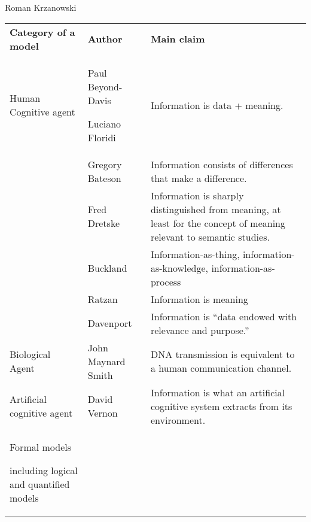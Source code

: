 \begin{artengenv}{Roman Krzanowski}
\begin{small}
\begin{longtable}{p{}p{}p{}}
{\bfseries Category of a model} &
{\bfseries Author} &
{\bfseries Main claim}\\
Human Cognitive agent &
Paul Beyond-Davis
\parencite*[][]{beynon-davies_business_2009}%


Luciano Floridi
\parencite*[][]{floridi_philosophy_2010}%
 &
Information is data + meaning.\\
&
Gregory Bateson
\parencite*[][]{bateson_mind_1979}%
 &
Information consists of differences that make a difference.\\
&
Fred Dretske
\parencite*[][]{dretske_knowledge_1999}%
 &
Information is sharply distinguished from meaning, at least for the concept of meaning relevant to semantic studies.\\
&
Buckland
\parencite*[][]{buckland_information_1991}%
 &
Information-as-thing, information-as-knowledge, information-as-process\\
&
Ratzan
\parencite*[][]{ratzan_understanding_2004}%
 &
Information is meaning\\
&
Davenport
\parencite*[][]{davenport_information_1997}%
 &
Information is ``data endowed with relevance and purpose.''\\
Biological Agent &
John Maynard Smith
\parencite*[][]{maynard_smith_concept_2000}%
 &
DNA transmission is equivalent to a human communication channel.\\
Artificial cognitive agent &
David Vernon
\parencite*[][]{vernon_artificial_2014}%
 &
Information is what an artificial cognitive system extracts from its environment.\\
Formal models

including logical and quantified models


\end{longtable}
\end{small}
\end{artengenv}
